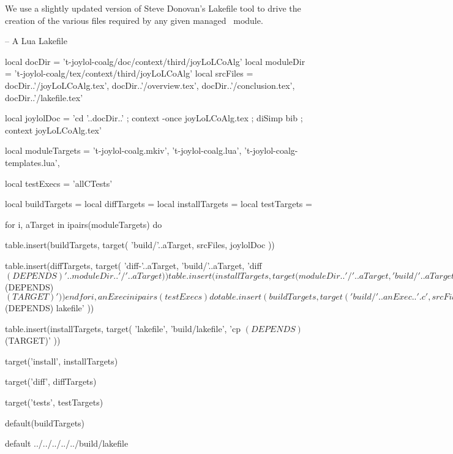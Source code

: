 
\startchapter[title=Lakefile]

We use a slightly updated version of Steve Donovan's Lakefile tool to 
drive the creation of the various files required by any given 
 managed \ConTeXt\ module. 

\startLakefile
-- A Lua Lakefile

local docDir    = 't-joylol-coalg/doc/context/third/joyLoLCoAlg'
local moduleDir = 't-joylol-coalg/tex/context/third/joyLoLCoAlg'
local srcFiles = {
  docDir..'/joyLoLCoAlg.tex',
  docDir..'/overview.tex',
  docDir..'/conclusion.tex',
  docDir..'/lakefile.tex'
}

local joylolDoc = 
  'cd '..docDir..' ; context -once joyLoLCoAlg.tex ; diSimp bib ; context joyLoLCoAlg.tex'

local moduleTargets = {
  't-joylol-coalg.mkiv',
  't-joylol-coalg.lua',
  't-joylol-coalg-templates.lua',
}

local testExecs = {
  'allCTests'
}

local buildTargets   = { }
local diffTargets    = { }
local installTargets = { }
local testTargets    = { }

for i, aTarget in ipairs(moduleTargets) do

  table.insert(buildTargets, target(
    'build/'..aTarget,
    srcFiles,
    joylolDoc
  ))

  table.insert(diffTargets, target(
    'diff-'..aTarget,
    'build/'..aTarget,
    'diff $(DEPENDS) '..moduleDir..'/'..aTarget
  ))

  table.insert(installTargets, target(
    moduleDir..'/'..aTarget,
    'build/'..aTarget,
    'cp $(DEPENDS) $(TARGET)'
  ))
end

for i, anExec in ipairs(testExecs) do

  table.insert(buildTargets, target(
    'build/'..anExec..'.c',
    srcFiles,
    joylolDoc
  ))

  c.program{
    'build/'..anExec,
    src=anExec..'.c',
    cdir='build',
    needs='lua5.2'
  }
  
  table.insert(testTargets, target(
    'build/'..anExec..'-results.lua',
    'build/'..anExec,
    './build/'..anExec
  ))
end

table.insert(buildTargets, target(
  'build/lakefile',
  srcFiles,
  joylolDoc
))

table.insert(diffTargets, target(
  'diff-lakefile',
  'build/lakefile',
  'diff $(DEPENDS) lakefile'
))

table.insert(installTargets, target(
  'lakefile',
  'build/lakefile',
  'cp $(DEPENDS) $(TARGET)'
))

target('install', installTargets)

target('diff', diffTargets)

target('tests', testTargets)

default(buildTargets)
\stopLakefile

\createLakefileFile%
  {default}%
  {../../../../../build/lakefile}%
  {}

\stopchapter